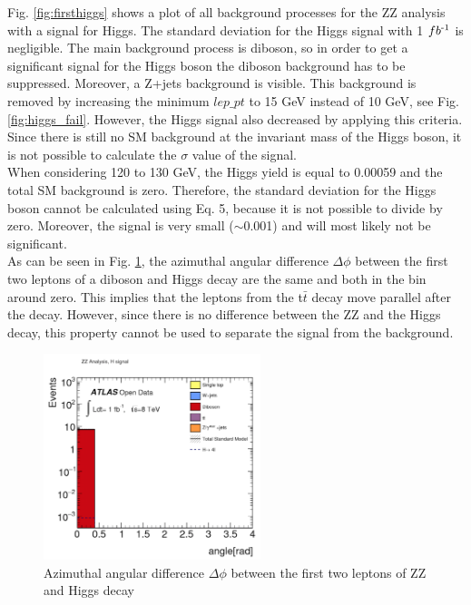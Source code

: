 \documentclass[runningheads,a4paper]{llncs}
\newcommand{\invfb}{fb\textsuperscript{-1}}
\begin{document}
Fig. \ref{fig:firsthiggs} shows a plot of all background processes for the ZZ analysis with a signal for Higgs. The standard deviation for the Higgs signal with 1 $\invfb$ is negligible. The main background process is diboson, so in order to get a significant signal for the Higgs boson the diboson background has to be suppressed. Moreover, a Z+jets background is visible. This background is removed by increasing the minimum $lep\_pt$ to 15 GeV instead of 10 GeV, see Fig. \ref{fig:higgs_fail}. However, the Higgs signal also decreased by applying this criteria. Since there is still no SM background at the invariant mass of the Higgs boson, it is not possible to calculate the $\sigma$ value of the signal.\\

When considering 120 to 130 GeV, the Higgs yield is equal to 0.00059 and the total SM background is zero. Therefore, the standard deviation for the Higgs boson cannot be calculated using Eq. 5, because it is not possible to divide by zero. Moreover, the signal is very small ($\sim$0.001) and will most likely not be significant.\\

As can be seen in Fig. \ref{fig:deltaphi1}, the azimuthal angular difference $\Delta \phi$ between the first two leptons of a diboson and Higgs decay are the same and both in the bin around zero. This implies that the leptons from the t$\bar{t}$ decay move parallel after the decay. However, since there is no difference between the ZZ and the Higgs decay, this property cannot be used to separate the signal from the background.\\

\begin{figure}[H]
\centering
\includegraphics[height=6cm]{DeltaPhi1_screenshot}
\caption{Azimuthal angular difference $\Delta \phi$ between the first two leptons of ZZ and Higgs decay}
\label{fig:deltaphi1}
\end{figure}
\end{document}
